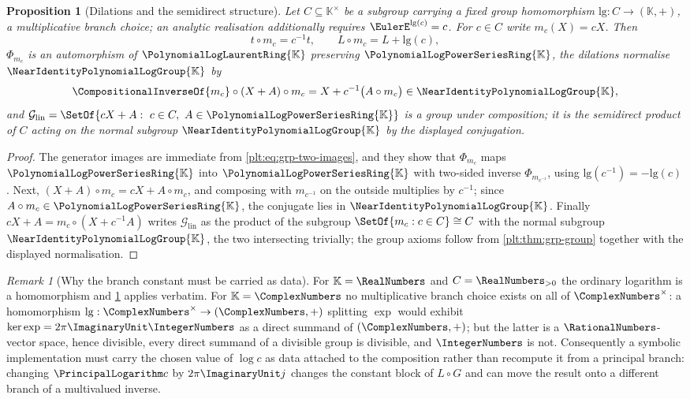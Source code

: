 \documentclass[11pt,oneside]{article}
\theoremstyle{plain}
\newtheorem{proposition}[theorem]{Proposition}
\theoremstyle{definition}
\theoremstyle{remark}
\newtheorem{remark}[theorem]{Remark}
\newcommand{\K}{\mathbb{K}}
\newcommand{\PLpow}{\PolynomialLogPowerSeriesRing{\K}}   %
\newcommand{\PLlau}{\PolynomialLogLaurentRing{\K}}       %
\newcommand{\Gnear}{\NearIdentityPolynomialLogGroup{\K}} %
\newcommand{\compose}{\mathbin{\circ}}
\begin{document}

\begin{proposition}[Dilations and the semidirect structure]
\label{plt:prop:grp-dilation}
Let \(C\subseteq\K^{\times}\) be a subgroup carrying a fixed group homomorphism
\(\mathrm{lg}:C\to(\K,+)\), a \emph{multiplicative branch choice}; an analytic
realisation additionally requires \(\EulerE^{\mathrm{lg}(c)}=c\).  For
\(c\in C\) write \(m_c(X)=cX\).  Then
\[
  t\compose m_c=c^{-1}t,
  \qquad
  L\compose m_c=L+\mathrm{lg}(c),
\]
\(\Phi_{m_c}\) is an automorphism of \(\PLlau\) preserving \(\PLpow\), the
dilations normalise \(\Gnear\) by
\[
  \CompositionalInverseOf{m_c}\compose(X+A)\compose m_c
  =X+c^{-1}\bigl(A\compose m_c\bigr)\in\Gnear,
\]
and \(\mathcal G_{\mathrm{lin}}=\SetOf{cX+A:\ c\in C,\ A\in\PLpow}\) is a group
under composition; it is the semidirect product of \(C\) acting on the normal
subgroup \(\Gnear\) by the displayed conjugation.
\end{proposition}

\begin{proof}
The generator images are immediate from \eqref{plt:eq:grp-two-images}, and they
show that \(\Phi_{m_c}\) maps \(\PLpow\) into \(\PLpow\) with two-sided inverse
\(\Phi_{m_{c^{-1}}}\), using \(\mathrm{lg}(c^{-1})=-\mathrm{lg}(c)\).  Next,
\((X+A)\compose m_c=cX+A\compose m_c\), and composing with \(m_{c^{-1}}\) on
the outside multiplies by \(c^{-1}\); since \(A\compose m_c\in\PLpow\), the
conjugate lies in \(\Gnear\).  Finally \(cX+A=m_c\compose(X+c^{-1}A)\) writes
\(\mathcal G_{\mathrm{lin}}\) as the product of the subgroup
\(\SetOf{m_c:c\in C}\cong C\) with the normal subgroup \(\Gnear\), the two
intersecting trivially; the group axioms follow from
\cref{plt:thm:grp-group} together with the displayed normalisation.
\end{proof}

\begin{remark}[Why the branch constant must be carried as data]
\label{plt:rmk:grp-branch}
For \(\K=\RealNumbers\) and \(C=\RealNumbers_{>0}\) the ordinary logarithm is a
homomorphism and \cref{plt:prop:grp-dilation} applies verbatim.  For
\(\K=\ComplexNumbers\) no multiplicative branch choice exists on all of
\(\ComplexNumbers^{\times}\): a homomorphism
\(\mathrm{lg}:\ComplexNumbers^{\times}\to(\ComplexNumbers,+)\) splitting
\(\exp\) would exhibit \(\ker\exp=2\pi\ImaginaryUnit\IntegerNumbers\) as a
direct summand of \((\ComplexNumbers,+)\); but the latter is a
\(\RationalNumbers\)-vector space, hence divisible, every direct summand of a
divisible group is divisible, and \(\IntegerNumbers\) is not.  Consequently a
symbolic implementation must carry the chosen value of \(\log c\) as data
attached to the composition rather than recompute it from a principal branch:
changing \(\PrincipalLogarithm c\) by \(2\pi\ImaginaryUnit j\) changes the
constant block of \(L\compose G\) and can move the result onto a different
branch of a multivalued inverse.
\end{remark}
\end{document}
